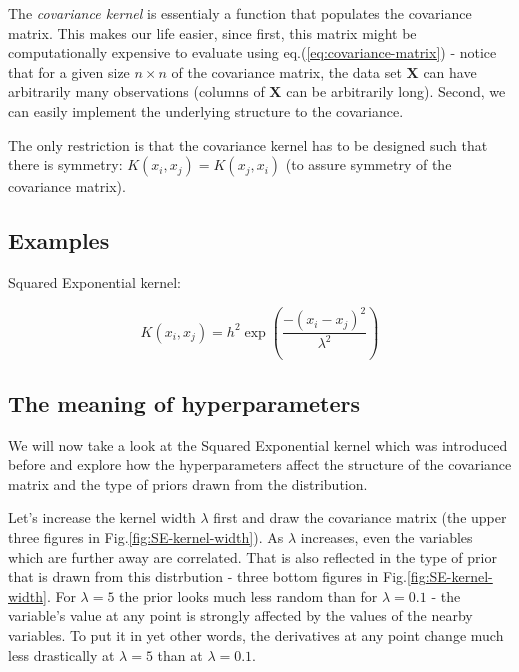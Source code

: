 \documentclass[10pt,twocolumn]{article}
\newcommand\pythonstyle{\lstset{
language=Python,
basicstyle=\ttm,
otherkeywords={self},             %
keywordstyle=\ttb\color{deepblue},
emph={MyClass,__init__},          %
emphstyle=\ttb\color{deepred},    %
stringstyle=\color{deepgreen},
frame=tb,                         %
showstringspaces=false            %
}}
\newcommand\pythoninline[1]{{\pythonstyle\lstinline!#1!}}
\begin{document}
The \textit{covariance kernel} is essentialy a function that populates the covariance matrix. This makes our life easier, since first, this matrix might be computationally expensive to evaluate using eq.(\ref{eq:covariance-matrix}) - notice that for a given size $n \times n$ of the covariance matrix, the data set $\mathbf{X}$ can have arbitrarily many observations (columns of $\mathbf{X}$ can be arbitrarily long). Second, we can easily implement the underlying structure to the covariance.

The only restriction is that the covariance kernel has to be designed such that there is symmetry: $K(x_i, x_j) = K(x_j, x_i)$ (to assure symmetry of the covariance matrix).


\subsection{Examples}

Squared Exponential kernel:

\begin{equation}
K(x_i, x_j) = h^2 \exp(\frac{- (x_i - x_j)^2}{\lambda^2})
\end{equation}


\subsection{The meaning of hyperparameters} \label{sec:meaning-of-hyp}

We will now take a look at the Squared Exponential kernel which was introduced before and explore how the hyperparameters affect the structure of the covariance matrix and the type of priors drawn from the distribution.


Let's increase the kernel width $\lambda$ first and draw the covariance matrix (the upper three figures in Fig.\ref{fig:SE-kernel-width}). As $\lambda$ increases, even the variables which are further away are correlated. That is also reflected in the type of prior that is drawn from this distrbution - three bottom figures in Fig.\ref{fig:SE-kernel-width}. For $\lambda = 5$ the prior looks much less random than for $\lambda = 0.1$ - the variable's value at any point is strongly affected by the values of the nearby variables. To put it in yet other words, the derivatives at any point change much less drastically at $\lambda = 5$ than at $\lambda = 0.1$.
\end{document}
